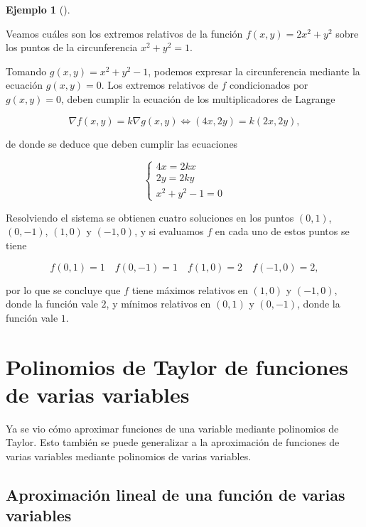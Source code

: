 \documentclass[
  a4paper,
]{scrreport}
\theoremstyle{plain}
\theoremstyle{definition}
\theoremstyle{plain}
\theoremstyle{plain}
\theoremstyle{definition}
\newtheorem{example}{Ejemplo}[chapter]
\theoremstyle{definition}
\theoremstyle{remark}
\begin{document}
\begin{example}[]\protect\hypertarget{exm-multiplicadores-lagrange}{}\label{exm-multiplicadores-lagrange}

Veamos cuáles son los extremos relativos de la función
\(f(x,y)=2x^2+y^2\) sobre los puntos de la circunferencia \(x^2+y^2=1\).

Tomando \(g(x,y)=x^2+y^2-1\), podemos expresar la circunferencia
mediante la ecuación \(g(x,y)=0\). Los extremos relativos de \(f\)
condicionados por \(g(x,y)=0\), deben cumplir la ecuación de los
multiplicadores de Lagrange

\[
\nabla f(x,y) = k \nabla g(x,y) 
\Leftrightarrow (4x, 2y) = k (2x, 2y),
\]

de donde se deduce que deben cumplir las ecuaciones

\[
\begin{cases}
4x = 2kx\\
2y = 2ky\\
x^2+y^2-1=0
\end{cases}
\]

Resolviendo el sistema se obtienen cuatro soluciones en los puntos
\((0,1)\), \((0,-1)\), \((1,0)\) y \((-1,0)\), y si evaluamos \(f\) en
cada uno de estos puntos se tiene

\[
f(0,1) = 1 \quad f(0,-1) = 1 \quad f(1,0)=2 \quad f(-1,0)=2,
\]

por lo que se concluye que \(f\) tiene máximos relativos en \((1,0)\) y
\((-1,0)\), donde la función vale \(2\), y mínimos relativos en
\((0,1)\) y \((0,-1)\), donde la función vale \(1\).

\end{example}

\section{Polinomios de Taylor de funciones de varias
variables}\label{polinomios-de-taylor-de-funciones-de-varias-variables}

Ya se vio cómo aproximar funciones de una variable mediante polinomios
de Taylor. Esto también se puede generalizar a la aproximación de
funciones de varias variables mediante polinomios de varias variables.

\subsection{Aproximación lineal de una función de varias
variables}\label{aproximaciuxf3n-lineal-de-una-funciuxf3n-de-varias-variables}
\end{document}
